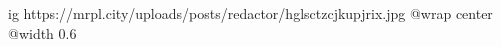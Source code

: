  
 
 
 
 

\ifcmt
  ig https://mrpl.city/uploads/posts/redactor/hglsctzcjkupjrix.jpg
  @wrap center
  @width 0.6
\fi
